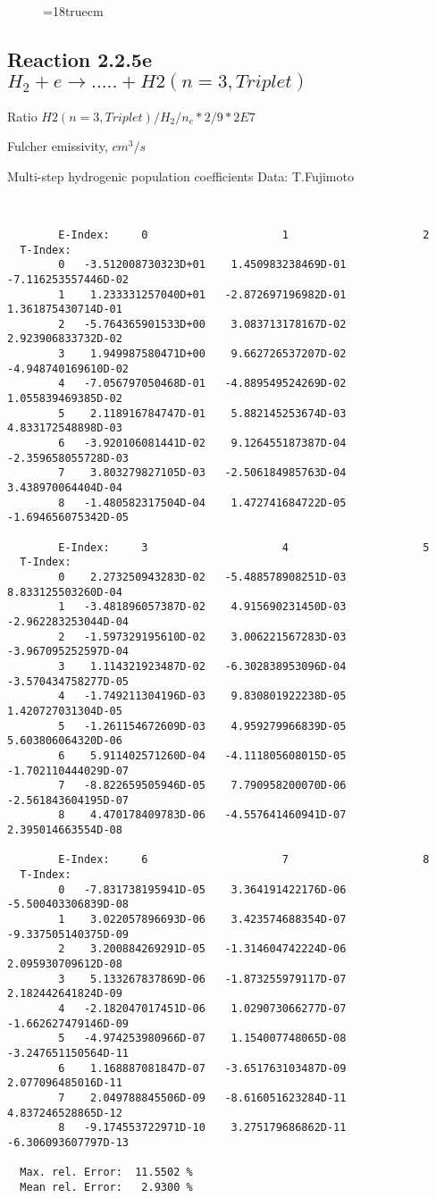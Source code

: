 \begin{figure} \label{2.2.5d}
\epsfxsize=18truecm
\end{figure}

\newpage
\subsection{
Reaction 2.2.5e  $H_2 + e \rightarrow .....+H2(n=3,Triplet)$}

Ratio $H2(n=3, Triplet)/H_2/n_e*2/9*2E7 $

 Fulcher emissivity, $cm^3/s$

 Multi-step hydrogenic population coefficients
 Data: T.Fujimoto
\begin{verbatim}


        E-Index:     0                     1                     2
  T-Index:
        0   -3.512008730323D+01    1.450983238469D-01   -7.116253557446D-02
        1    1.233331257040D+01   -2.872697196982D-01    1.361875430714D-01
        2   -5.764365901533D+00    3.083713178167D-02    2.923906833732D-02
        3    1.949987580471D+00    9.662726537207D-02   -4.948740169610D-02
        4   -7.056797050468D-01   -4.889549524269D-02    1.055839469385D-02
        5    2.118916784747D-01    5.882145253674D-03    4.833172548898D-03
        6   -3.920106081441D-02    9.126455187387D-04   -2.359658055728D-03
        7    3.803279827105D-03   -2.506184985763D-04    3.438970064404D-04
        8   -1.480582317504D-04    1.472741684722D-05   -1.694656075342D-05

        E-Index:     3                     4                     5
  T-Index:
        0    2.273250943283D-02   -5.488578908251D-03    8.833125503260D-04
        1   -3.481896057387D-02    4.915690231450D-03   -2.962283253044D-04
        2   -1.597329195610D-02    3.006221567283D-03   -3.967095252597D-04
        3    1.114321923487D-02   -6.302838953096D-04   -3.570434758277D-05
        4   -1.749211304196D-03    9.830801922238D-05    1.420727031304D-05
        5   -1.261154672609D-03    4.959279966839D-05    5.603806064320D-06
        6    5.911402571260D-04   -4.111805608015D-05   -1.702110444029D-07
        7   -8.822659505946D-05    7.790958200070D-06   -2.561843604195D-07
        8    4.470178409783D-06   -4.557641460941D-07    2.395014663554D-08

        E-Index:     6                     7                     8
  T-Index:
        0   -7.831738195941D-05    3.364191422176D-06   -5.500403306839D-08
        1    3.022057896693D-06    3.423574688354D-07   -9.337505140375D-09
        2    3.200884269291D-05   -1.314604742224D-06    2.095930709612D-08
        3    5.133267837869D-06   -1.873255979117D-07    2.182442641824D-09
        4   -2.182047017451D-06    1.029073066277D-07   -1.662627479146D-09
        5   -4.974253980966D-07    1.154007748065D-08   -3.247651150564D-11
        6    1.168887081847D-07   -3.651763103487D-09    2.077096485016D-11
        7    2.049788845506D-09   -8.616051623284D-11    4.837246528865D-12
        8   -9.174553722971D-10    3.275179686862D-11   -6.306093607797D-13

  Max. rel. Error:  11.5502 %
  Mean rel. Error:   2.9300 %

\end{verbatim}
